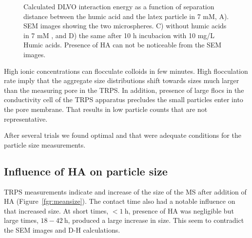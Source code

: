 \documentclass[journal=langd5,manuscript=article]{achemso}
\begin{document}
\begin{figure}
\begin{tabular}{|l|l|}
 \hline
  \end{tabular}
  \caption{Calculated DLVO interaction energy as a function of separation distance between the humic acid and the latex particle in  7 mM, A). SEM images showing the two microspheres. C) without humic acids in 7 mM , and D)  the same after 10 h incubacion with 10 mg/L Humic acids. Presence of HA can not be noticeable from the SEM images.} 
  \label{fgr:SEM_50000X}
\end{figure}




High ionic concentrations can flocculate colloids in
few minutes. 
High flocculation rate imply that the aggregate size distributions shift towards sizes much larger than the measuring pore in the TRPS.
In addition, presence of large flocs in the conductivity cell of the TRPS apparatus precludes the 
small particles enter into the pore membrane. That results in low particle counts that are not representative.

After several trials we found optimal 
and  %
that were adequate conditions for the particle size measurements.








\subsection{Influence of HA on particle size}

TRPS measurements indicate and increase of the   size of the MS after addition of HA (Figure~\ref{fgr:meansize}). The contact time also had a notable influence on that increased size. At short times,
$< 1~\mathrm{h}$, 
presence of HA was negligible but large times, 
$18 - 42~\mathrm{h}$,
produced a large increase in size. This seem to contradict the SEM images and D-H calculations.
\end{document}
